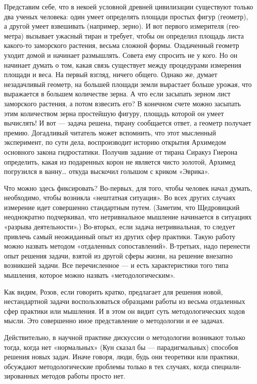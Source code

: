 \documentclass[11pt,a4paper]{article}
\begin{document}
Представим себе, что в некоей условной древней цивилизации существуют только
два ученых человека: один умеет определять площади простых фигур (геометр),
а другой умеет взвешивать (например, зерно). И вот первого измерителя (гео-
метра) вызывает ужасный тиран и требует, чтобы он определил площадь листа
какого-то заморского растения, весьма сложной формы. Озадаченный геометр
уходит домой и начинает размышлять. Совета ему спросить не у кого. Но он
начинает думать о том, какая связь существует между процедурами измерения
площади и веса. На первый взгляд, ничего общего. Однако же, думает
незадачливый геометр, на большей площади земли вырастает больше урожая, что
выражается в большем количестве зерна. А что если засыпать зерном лист
заморского растения, а потом взвесить его? В конечном счете можно засыпать
этим количеством зерна простейшую фигуру, площадь которой он умеет
вычислять! И вот — задача решена, тирану сообщается ответ, а геометр получает
премию. Догадливый читатель может вспомнить, что этот мысленный эксперимент,
по сути дела, воспроизводит историю открытия Архимедом основного закона
гидростатики. Получив задание от тирана Сиракуз Гиерона определить, какая
из подаренных корон не является чисто золотой, Архимед погрузился в ванну…
откуда выскочил голышом с криком «Эврика».

Что можно здесь фиксировать? Во-первых, для того, чтобы человек начал думать,
необходимо, чтобы возникла «нештатная ситуация». Во всех других случаях
измерение идет совершенно стандартным путем. (Заметим, что Щедровицкий
неоднократно подчеркивал, что нетривиальное мышление начинается в ситуациях
«разрыва деятельности».) Во-вторых, если задача нетривиальная, то следует
привлечь самый неожиданный опыт из других сфер практики. Такую работу можно
назвать методом «отдаленных сопоставлений». В-третьих, надо перенести опыт
решения задачи, взятой из другой сферы жизни, на решение внезапно возникшей
задачи. Все перечисленное — и есть характеристики того типа мышления, которое
можно назвать «методологическим».

Как видим, Розов, если говорить кратко, предлагает для решения новой,
нестандартной задачи воспользоваться образцами работы из весьма отдаленных
сфер практики или мышления.  И в этом он видит суть методологических ходов
мысли. Это совершенно иное представление о методологии и ее задачах.

Действительно, в научной практике дискуссии о методологии возникают только
тогда, когда нет «нормальных» (Кун сказал бы — парадигмальных) способов
решения новых задач. Иначе говоря, люди, будь они теоретики или практики,
обсуждают методологические проблемы только в тех случаях, когда специали-
зированных методов работы просто нет.
\end{document}
